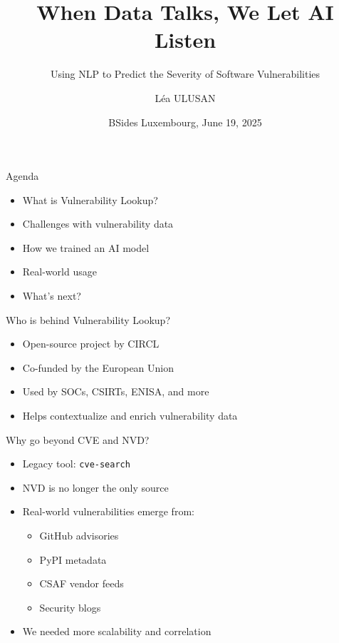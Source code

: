 \documentclass{beamer}
\title{When Data Talks, We Let AI Listen}
\subtitle{Using NLP to Predict the Severity of Software Vulnerabilities}
\author{Léa ULUSAN}
\institute{CIRCL - Computer Incident Response Center Luxembourg}
\date{BSides Luxembourg, June 19, 2025}
\begin{document}
\maketitle

\begin{frame}{Agenda}
    \begin{itemize}
        \item What is Vulnerability Lookup?
        \item Challenges with vulnerability data
        \item How we trained an AI model
        \item Real-world usage
        \item What's next?
    \end{itemize}
\end{frame}

\begin{frame}{Who is behind Vulnerability Lookup?}
    \begin{itemize}
        \item Open-source project by CIRCL
        \item Co-funded by the European Union
        \item Used by SOCs, CSIRTs, ENISA, and more
        \item Helps contextualize and enrich vulnerability data
    \end{itemize}
\end{frame}

\begin{frame}{Why go beyond CVE and NVD?}
    \begin{itemize}
        \item Legacy tool: \texttt{cve-search}
        \item NVD is no longer the only source
        \item Real-world vulnerabilities emerge from:
            \begin{itemize}
                \item GitHub advisories
                \item PyPI metadata
                \item CSAF vendor feeds
                \item Security blogs
            \end{itemize}
        \item We needed more scalability and correlation
    \end{itemize}
\end{frame}
\end{document}
